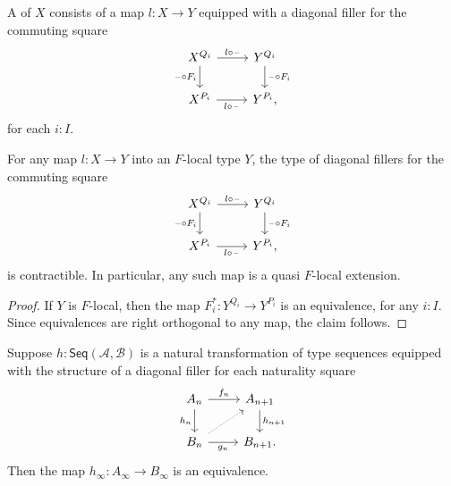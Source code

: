 \begin{defn}
A  of $X$ consists of a map $l:X\to Y$ equipped with a diagonal filler for the commuting square
\begin{equation*}
\begin{tikzcd}
X^{Q_i} \arrow[r,"l\circ\blank"] \arrow[d,swap,"\blank\circ F_i"] & Y^{Q_i} \arrow[d,"\blank\circ F_i"] \\
X^{P_i} \arrow[r,swap,"l\circ \blank"] & Y^{P_i},
\end{tikzcd}
\end{equation*}
for each $i:I$.
\end{defn}

\begin{lem}\label{lem:qflocal_local}
For any map $l:X\to Y$ into an $F$-local type $Y$, the type of diagonal fillers for the commuting square
\begin{equation*}
\begin{tikzcd}
X^{Q_i} \arrow[r,"l\circ\blank"] \arrow[d,swap,"\blank\circ F_i"] & Y^{Q_i} \arrow[d,"\blank\circ F_i"] \\
X^{P_i} \arrow[r,swap,"l\circ \blank"] & Y^{P_i},
\end{tikzcd}
\end{equation*}
is contractible. In particular, any such map is a quasi $F$-local extension.
\end{lem}

\begin{proof}
If $Y$ is $F$-local, then the map $F_i^\ast : Y^{Q_i}\to Y^{P_i}$ is an equivalence, for any $i:I$. Since equivalences are right orthogonal to any map, the claim follows.
\end{proof}

\begin{lem}
Suppose $h:\mathsf{Seq}(\mathcal{A},\mathcal{B})$ is a natural transformation of type sequences equipped with the structure of a diagonal filler for each naturality square
\begin{equation*}
\begin{tikzcd}
A_n \arrow[r,"f_n"] \arrow[d,swap,"h_n"] & A_{n+1} \arrow[d,"h_{n+1}"] \\
B_n \arrow[r,swap,"g_n"] \arrow[ur,densely dotted] & B_{n+1}.
\end{tikzcd}
\end{equation*}
Then the map $h_\infty : A_\infty\to B_\infty$ is an equivalence. 
\end{lem}

